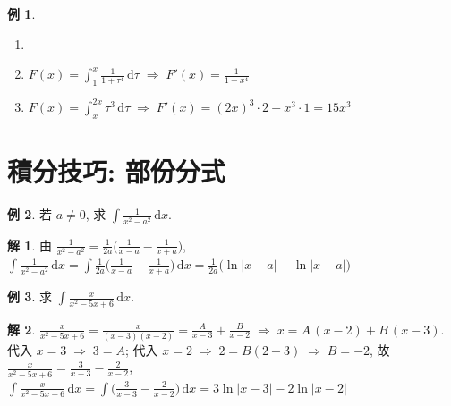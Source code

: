 \documentclass[12pt,a4paper]{extarticle}
\newcommand{\ds}{\displaystyle}
\newcommand{\ie}{\;\Longrightarrow\;}
\theoremstyle{definition}
\newtheorem*{ex}{例}
\newtheorem*{sol}{解}
\begin{document}
\begin{ex} 
  \begin{enumerate}\setlength{\itemsep}{0pt}
    \item[]
    \item $\ds F(x) = \int_1^x\frac{1}{1 + \tau^4}\,\mathrm{d}\tau \ie F'(x) = \frac{1}{1 + x^4}$ 
    \item $\ds F(x) = \int_{x}^{2x}\tau^3\,\mathrm{d}\tau \ie F'(x) = (2x)^3\cdot 2 - x^3\cdot 1 = 15x^3$
  \end{enumerate}
\end{ex}

\section*{積分技巧: 部份分式}

\begin{ex}
  若 $a\ne 0$, 求 $\ds\int\!\frac{1}{x^2 - a^2}\,\text{d}x$. 
\end{ex}

\begin{sol}
  由 $\ds\frac{1}{x^2 - a^2} = \frac{1}{2a}\bigg(\frac{1}{x - a} - \frac{1}{x + a}\bigg)$, $\ds\int\!\frac{1}{x^2 - a^2}\,\text{d}x = \int\frac{1}{2a}\bigg(\frac{1}{x - a} - \frac{1}{x + a}\bigg)\,\text{d}x = \frac{1}{2a}\big(\ln|x - a| - \ln|x + a|\big)$
\end{sol}

\begin{ex}
  求 $\ds\int\!\frac{x}{x^2 - 5x + 6}\,\text{d}x$. 
\end{ex}

\begin{sol}
  $\ds\frac{x}{x^2 - 5x + 6} = \frac{x}{(x - 3)(x - 2)} = \frac{A}{x - 3} + \frac{B}{x - 2} \ie x = A\,(x - 2) + B\,(x - 3)$. 代入 $x = 3\ie 3 = A$; 代入 $x = 2\ie 2 = B(2 - 3) \ie B = -2$, 故 $\ds\frac{x}{x^2 - 5x + 6} = \frac{3}{x - 3} - \frac{2}{x - 2}$, $\ds\int\!\frac{x}{x^2 - 5x + 6}\,\text{d}x = \int\bigg(\frac{3}{x - 3} - \frac{2}{x - 2}\bigg)\,\text{d}x = 3\ln|x - 3| - 2\ln|x - 2|$
\end{sol}
\end{document}
